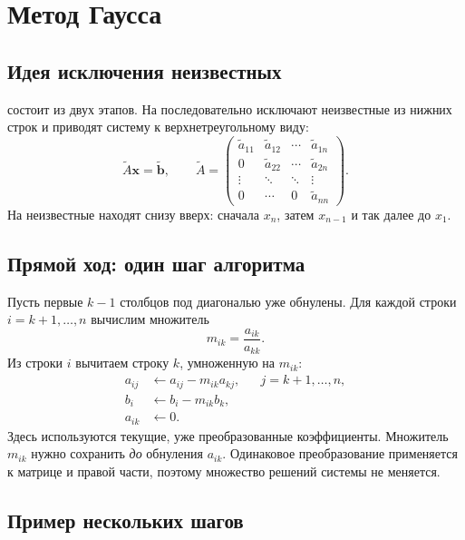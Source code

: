 \documentclass[../final.tex]{subfiles}
\begin{document}
\section{Метод Гаусса}

\subsection{Идея исключения неизвестных}

 состоит из двух этапов.
На  последовательно исключают неизвестные
из нижних строк и приводят систему к верхнетреугольному виду:
\begin{equation*}
    \widetilde A\boldsymbol x=\widetilde{\boldsymbol b},\qquad
    \widetilde A=
    \begin{pmatrix}
        \widetilde a_{11}&\widetilde a_{12}&\cdots&\widetilde a_{1n}\\
        0&\widetilde a_{22}&\cdots&\widetilde a_{2n}\\
        \vdots&\ddots&\ddots&\vdots\\
        0&\cdots&0&\widetilde a_{nn}
    \end{pmatrix}.
\end{equation*}
На  неизвестные находят снизу вверх:
сначала $x_n$, затем $x_{n-1}$ и так далее до $x_1$.

\subsection{Прямой ход: один шаг алгоритма}

Пусть первые $k-1$ столбцов под диагональю уже обнулены.
Для каждой строки $i=k+1,\ldots,n$ вычислим множитель
\begin{equation*}
    m_{ik}=\frac{a_{ik}}{a_{kk}}.
\end{equation*}
Из строки $i$ вычитаем строку $k$, умноженную на $m_{ik}$:
\begin{align*}
    a_{ij}&\leftarrow a_{ij}-m_{ik}a_{kj},
        &&j=k+1,\ldots,n,\\
    b_i&\leftarrow b_i-m_{ik}b_k,\\
    a_{ik}&\leftarrow0.
\end{align*}
Здесь используются текущие, уже преобразованные коэффициенты.
Множитель $m_{ik}$ нужно сохранить \emph{до} обнуления $a_{ik}$.
Одинаковое преобразование применяется к матрице и правой части,
поэтому множество решений системы не меняется.

\subsection{Пример нескольких шагов}
\end{document}
